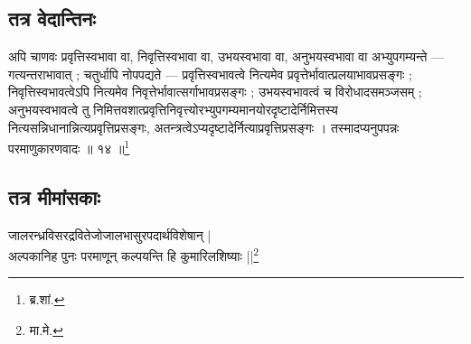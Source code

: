 \subsection{तत्र वेदान्तिनः} अपि चाणवः प्रवृत्तिस्वभावा वा, निवृत्तिस्वभावा वा, उभयस्वभावा वा, अनुभयस्वभावा वा अभ्युपगम्यन्ते — गत्यन्तराभावात् ; चतुर्धापि नोपपद्यते — प्रवृत्तिस्वभावत्वे नित्यमेव प्रवृत्तेर्भावात्प्रलयाभावप्रसङ्गः ; निवृत्तिस्वभावत्वेऽपि नित्यमेव निवृत्तेर्भावात्सर्गाभावप्रसङ्गः ; उभयस्वभावत्वं च विरोधादसमञ्जसम् ; अनुभयस्वभावत्वे तु निमित्तवशात्प्रवृत्तिनिवृत्त्योरभ्युपगम्यमानयोरदृष्टादेर्निमित्तस्य नित्यसन्निधानान्नित्यप्रवृत्तिप्रसङ्गः, अतन्त्रत्वेऽप्यदृष्टादेर्नित्याप्रवृत्तिप्रसङ्गः । तस्मादप्यनुपपन्नः परमाणुकारणवादः ॥ १४ ॥\footnote{ब्र.शां.}


\subsection{तत्र मीमांसकाः} जालरन्ध्रविसरद्रवितेजोजालभासुरपदार्थविशेषान् |\\ अल्पकानिह पुनः परमाणून् कल्पयन्ति हि कुमारिलशिष्याः ||\footnote{मा.मे.}

